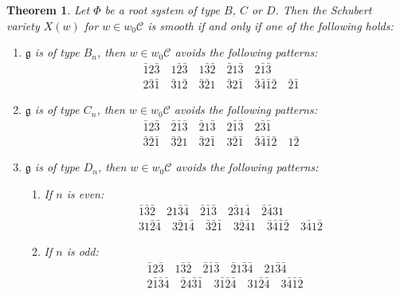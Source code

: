 \documentclass[11pt, reqno]{amsart}
\newtheorem{Thm}{Theorem}[section]
\theoremstyle{definition}
\numberwithin{equation}{section}
\begin{document}
\begin{Thm} \label{pattern-avoid}
    Let $\Phi$ be a root system of type $B$, $C$ or $D$. Then the Schubert variety $X(w)$ for $w\in w_0\mathcal{C}$ is smooth if and only if one of the following holds:
    \begin{enumerate}
        \item $\mathfrak{g}$ is of type $B_n$, then $w\in w_0\mathcal{C}$ avoids the following patterns:
        \begin{align*}
            &\bar{1}2\bar{3}\quad 1\bar{2}\bar{3}\quad 1\bar{3}\bar{2}\quad  \bar{2}1\bar{3}\quad 2\bar{1}\bar{3}\quad  \\ & 2\bar{3}\bar{1}\quad
            \bar{3}1\bar{2}\quad \bar{3}\bar{2}1\quad
           \bar{3}2\bar{1}\quad \bar{3}\bar{4}\bar{1}\bar{2}\quad \bar{2}\bar{1}
        \end{align*}

 \item $\mathfrak{g}$ is of type $C_n$, then $w\in w_0\mathcal{C}$ avoids the following patterns:
        \begin{align*}
            &\bar{1}2\bar{3}\quad \bar{2}\bar{1}\bar{3}\quad \bar{2}1\bar{3}\quad 2\bar{1}\bar{3}\quad 2\bar{3}\bar{1}\quad \\ & \bar{3}\bar{2}\bar{1}\quad \bar{3}\bar{2}1\quad
           \bar{3}2\bar{1}\quad 3\bar{2}\bar{1}\quad \bar{3}\bar{4}\bar{1}\bar{2}\quad 1\bar{2}
        \end{align*}
        
 \item $\mathfrak{g}$ is of type $D_n$, then $w\in w_0\mathcal{C}$ avoids the following patterns:
\begin{enumerate}
    \item If $n$ is even: 
 \begin{align*}
            &\bar{1}\bar{3}\bar{2}\quad 21\bar{3}\bar{4}\quad  
            \bar{2}\bar{1}\bar{3}\quad
            2\bar{3}1\bar{4}\quad \bar{2}\bar{4}31\quad 
             \\& 
             31\bar{2}\bar{4}\quad 
            3\bar{2}1\bar{4}\quad 
            \bar{3}\bar{2}\bar{1}\quad
            3\bar{2}\bar{4}1\quad \bar{3}\bar{4}\bar{1}\bar{2}\quad 3\bar{4}1\bar{2}   
        \end{align*}

          \item If $n$ is odd:
\begin{align*}
            & \bar{1}2\bar{3}\quad 1\bar{3}\bar{2}\quad
            \bar{2}\bar{1}\bar{3}\quad \bar{2}1\bar{3}\bar{4}\quad 21\bar{3}\bar{4}\quad \\ &2\bar{1}\bar{3}\bar{4}\quad    \bar{2}4\bar{3}\bar{1}\quad 3\bar{1}\bar{2}\bar{4}\quad 31\bar{2}\bar{4}\quad  3\bar{4}\bar{1}\bar{2}\quad  
        \end{align*}          

\end{enumerate}
    \end{enumerate}
\end{Thm}
\end{document}
